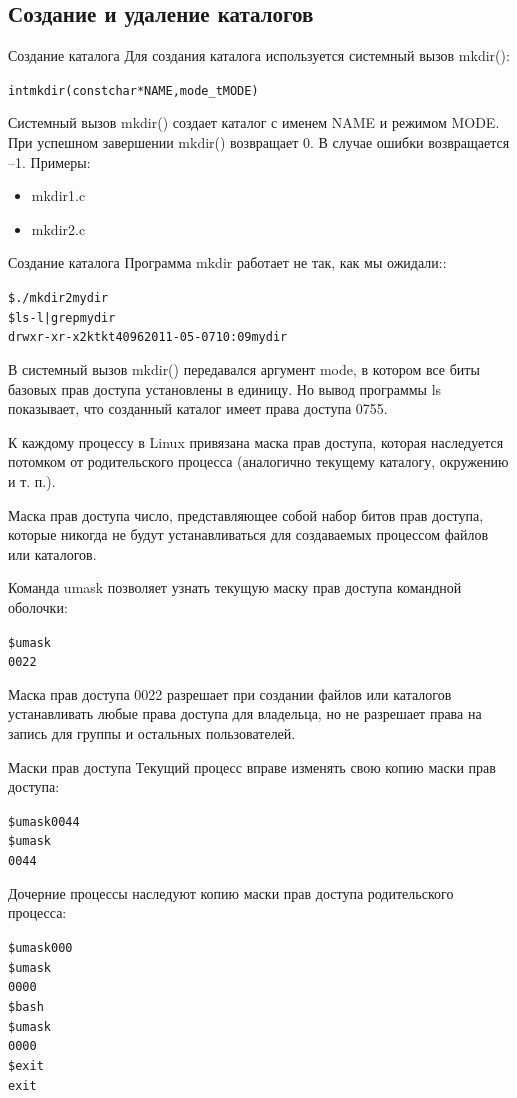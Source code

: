 \documentclass{beamer}
\begin{document}
\subsection{Создание и удаление каталогов}

\begin{frame}[fragile]{Создание каталога}
Для создания каталога используется системный вызов mkdir():
\begin{alltt}
int mkdir (const char * NAME, mode_t MODE)
\end{alltt}
Системный вызов mkdir() создает каталог с именем NAME и режимом MODE. При
успешном завершении mkdir() возвращает 0. В случае ошибки возвращается –1.
Примеры: 
\begin{itemize}
\item mkdir1.c
\item mkdir2.c
\end{itemize}
\end{frame}

\begin{frame}[fragile]{Создание каталога}
Программа mkdir работает не так, как мы ожидали::
\begin{alltt}
\$ ./mkdir2 mydir
\$ ls -l | grep mydir
drwxr-xr-x 2 kt kt 4096 2011-05-07 10:09 mydir
\end{alltt}
В системный вызов mkdir() передавался аргумент mode, в котором все биты базовых прав доступа установлены в единицу. Но вывод программы ls показывает, что созданный каталог имеет права доступа 0755.
\end{frame}

\begin{frame}[fragile]
К каждому процессу в Linux привязана маска прав доступа, которая наследуется потомком от родительского процесса (аналогично текущему каталогу, окружению и т. п.). 
\begin{block}{Маска прав доступа}
число, представляющее собой набор битов прав доступа, которые никогда не будут устанавливаться для создаваемых процессом файлов или каталогов.
\end{block}
Команда umask позволяет узнать текущую маску прав доступа командной оболочки:
\begin{alltt}
\$ umask
0022
\end{alltt}
Маска прав доступа 0022 разрешает при создании файлов или каталогов устанавливать любые права доступа для владельца, но не разрешает права на запись для группы и остальных пользователей.
\end{frame}

\begin{frame}[fragile]{Маски прав доступа}
Текущий процесс вправе изменять свою копию маски прав доступа:
\begin{alltt}
\$ umask 0044
\$ umask
0044
\end{alltt}
Дочерние процессы наследуют копию маски прав доступа родительского процесса:
\begin{alltt}
\$ umask 000
\$ umask
0000
\$ bash
\$ umask
0000
\$ exit
exit
\end{alltt}
\end{frame}
\end{document}
